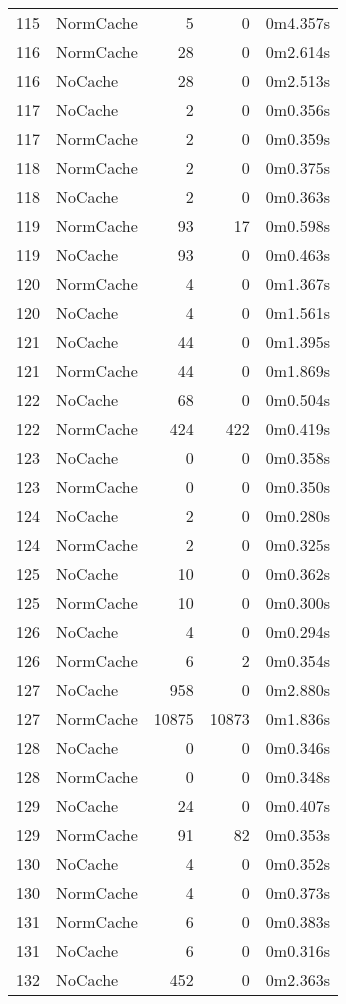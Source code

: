 \begin{tabular}{llrrl}
115 & NormCache & 5 & 0 & 0m4.357s \\
116 & NormCache & 28 & 0 & 0m2.614s \\
116 & NoCache & 28 & 0 & 0m2.513s \\
117 & NoCache & 2 & 0 & 0m0.356s \\
117 & NormCache & 2 & 0 & 0m0.359s \\
118 & NormCache & 2 & 0 & 0m0.375s \\
118 & NoCache & 2 & 0 & 0m0.363s \\
119 & NormCache & 93 & 17 & 0m0.598s \\
119 & NoCache & 93 & 0 & 0m0.463s \\
120 & NormCache & 4 & 0 & 0m1.367s \\
120 & NoCache & 4 & 0 & 0m1.561s \\
121 & NoCache & 44 & 0 & 0m1.395s \\
121 & NormCache & 44 & 0 & 0m1.869s \\
122 & NoCache & 68 & 0 & 0m0.504s \\
122 & NormCache & 424 & 422 & 0m0.419s \\
123 & NoCache & 0 & 0 & 0m0.358s \\
123 & NormCache & 0 & 0 & 0m0.350s \\
124 & NoCache & 2 & 0 & 0m0.280s \\
124 & NormCache & 2 & 0 & 0m0.325s \\
125 & NoCache & 10 & 0 & 0m0.362s \\
125 & NormCache & 10 & 0 & 0m0.300s \\
126 & NoCache & 4 & 0 & 0m0.294s \\
126 & NormCache & 6 & 2 & 0m0.354s \\
127 & NoCache & 958 & 0 & 0m2.880s \\
127 & NormCache & 10875 & 10873 & 0m1.836s \\
128 & NoCache & 0 & 0 & 0m0.346s \\
128 & NormCache & 0 & 0 & 0m0.348s \\
129 & NoCache & 24 & 0 & 0m0.407s \\
129 & NormCache & 91 & 82 & 0m0.353s \\
130 & NoCache & 4 & 0 & 0m0.352s \\
130 & NormCache & 4 & 0 & 0m0.373s \\
131 & NormCache & 6 & 0 & 0m0.383s \\
131 & NoCache & 6 & 0 & 0m0.316s \\
132 & NoCache & 452 & 0 & 0m2.363s \\

\end{tabular}
